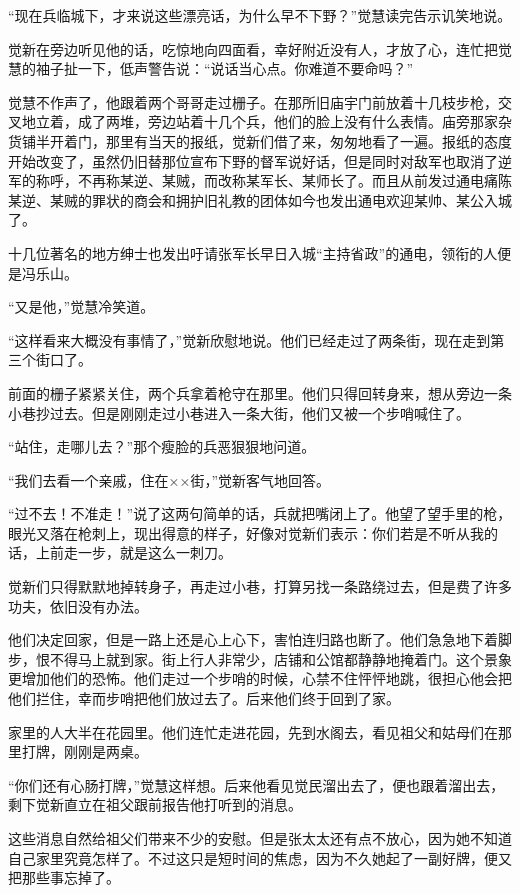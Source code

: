 \par “现在兵临城下，才来说这些漂亮话，为什么早不下野？”觉慧读完告示讥笑地说。
\par 觉新在旁边听见他的话，吃惊地向四面看，幸好附近没有人，才放了心，连忙把觉慧的袖子扯一下，低声警告说：“说话当心点。你难道不要命吗？”
\par 觉慧不作声了，他跟着两个哥哥走过栅子。在那所旧庙宇门前放着十几枝步枪，交叉地立着，成了两堆，旁边站着十几个兵，他们的脸上没有什么表情。庙旁那家杂货铺半开着门，那里有当天的报纸，觉新们借了来，匆匆地看了一遍。报纸的态度开始改变了，虽然仍旧替那位宣布下野的督军说好话，但是同时对敌军也取消了逆军的称呼，不再称某逆、某贼，而改称某军长、某师长了。而且从前发过通电痛陈某逆、某贼的罪状的商会和拥护旧礼教的团体如今也发出通电欢迎某帅、某公入城了。
\par 十几位著名的地方绅士也发出吁请张军长早日入城“主持省政”的通电，领衔的人便是冯乐山。
\par “又是他，”觉慧冷笑道。
\par “这样看来大概没有事情了，”觉新欣慰地说。他们已经走过了两条街，现在走到第三个街口了。
\par 前面的栅子紧紧关住，两个兵拿着枪守在那里。他们只得回转身来，想从旁边一条小巷抄过去。但是刚刚走过小巷进入一条大街，他们又被一个步哨喊住了。
\par “站住，走哪儿去？”那个瘦脸的兵恶狠狠地问道。
\par “我们去看一个亲戚，住在××街，”觉新客气地回答。
\par “过不去！不准走！”说了这两句简单的话，兵就把嘴闭上了。他望了望手里的枪，眼光又落在枪刺上，现出得意的样子，好像对觉新们表示：你们若是不听从我的话，上前走一步，就是这么一刺刀。
\par 觉新们只得默默地掉转身子，再走过小巷，打算另找一条路绕过去，但是费了许多功夫，依旧没有办法。
\par 他们决定回家，但是一路上还是心上心下，害怕连归路也断了。他们急急地下着脚步，恨不得马上就到家。街上行人非常少，店铺和公馆都静静地掩着门。这个景象更增加他们的恐怖。他们走过一个步哨的时候，心禁不住怦怦地跳，很担心他会把他们拦住，幸而步哨把他们放过去了。后来他们终于回到了家。
\par 家里的人大半在花园里。他们连忙走进花园，先到水阁去，看见祖父和姑母们在那里打牌，刚刚是两桌。
\par “你们还有心肠打牌，”觉慧这样想。后来他看见觉民溜出去了，便也跟着溜出去，剩下觉新直立在祖父跟前报告他打听到的消息。
\par 这些消息自然给祖父们带来不少的安慰。但是张太太还有点不放心，因为她不知道自己家里究竟怎样了。不过这只是短时间的焦虑，因为不久她起了一副好牌，便又把那些事忘掉了。
